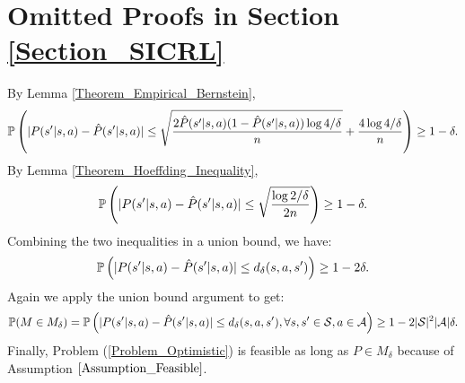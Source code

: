 \section{Omitted Proofs in Section \ref{Section_SICRL}}
\label{Appendix_Proofs_4}
By Lemma \ref{Theorem_Empirical_Bernstein}, 
$$
{\mathbb P}\left({|P(s^\prime|s,a)-\hat P(s^\prime|s,a)|\leq \sqrt{\frac{2\hat P(s^\prime|s,a)(1-\hat P(s^\prime|s,a))\log4/\delta}{n}}+\frac{4\log 4/\delta}{n}}\right)\geq 1-\delta.
$$
By Lemma \ref{Theorem_Hoeffding_Inequality}, 
$$
{\mathbb P}\left({|P(s^\prime|s,a)-\hat P(s^\prime|s,a)|\leq \sqrt{\frac{\log 2/\delta}{2n}}}\right)\geq  1-\delta.
$$
Combining the two inequalities in a union bound, we have:
$$
{\mathbb P}\left({|P(s^\prime|s,a)-\hat P(s^\prime|s,a)|\leq d_\delta(s,a,s^\prime)}\right)\geq  1-2\delta.
$$
Again we apply the union bound argument to get:
$$
{\mathbb P}(M\in M_\delta)={\mathbb P}\left({|P(s^\prime|s,a)-\hat P(s^\prime|s,a)|\leq d_\delta(s,a,s^\prime),\forall s,s^\prime\in {\mathcal{S}},a\in {\mathcal{A}}}\right)\geq  1-2|{\mathcal{S}}|^2|{\mathcal{A}}|\delta.
$$
Finally, Problem (\ref{Problem_Optimistic}) is feasible as long as $P\in M_\delta$ because of Assumption $\ref{Assumption_Feasible}$.
\endproof
